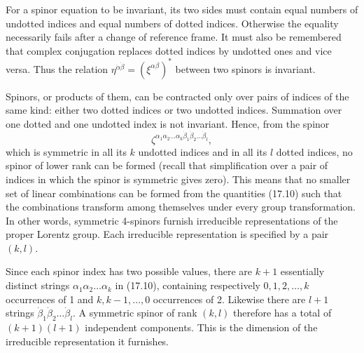 For a spinor equation to be invariant, its two sides must contain equal numbers of undotted indices and equal numbers of dotted indices. Otherwise the equality necessarily fails after a change of reference frame. It must also be remembered that complex conjugation replaces dotted indices by undotted ones and vice versa. Thus the relation $\eta^{\dot\alpha\dot\beta}=(\xi^{\alpha\beta})^*$ between two spinors is invariant.

Spinors, or products of them, can be contracted only over pairs of indices of the same kind: either two dotted indices or two undotted indices. Summation over one dotted and one undotted index is not invariant. Hence, from the spinor
\begin{equation}
\zeta^{\alpha_1\alpha_2\ldots\alpha_k\dot\beta_1\dot\beta_2\ldots\dot\beta_l},
\tag{17.10}
\end{equation}
which is symmetric in all its $k$ undotted indices and in all its $l$ dotted indices, no spinor of lower rank can be formed (recall that simplification over a pair of indices in which the spinor is symmetric gives zero). This means that no smaller set of linear combinations can be formed from the quantities (17.10) such that the combinations transform among themselves under every group transformation. In other words, symmetric 4-spinors furnish irreducible representations of the proper Lorentz group. Each irreducible representation is specified by a pair $(k,l)$.

Since each spinor index has two possible values, there are $k+1$ essentially distinct strings $\alpha_1\alpha_2\ldots\alpha_k$ in (17.10), containing respectively $0,1,2,\ldots,k$ occurrences of 1 and $k,k-1,\ldots,0$ occurrences of 2. Likewise there are $l+1$ strings $\dot\beta_1\dot\beta_2\ldots\dot\beta_l$. A symmetric spinor of rank $(k,l)$ therefore has a total of $(k+1)(l+1)$ independent components. This is the dimension of the irreducible representation it furnishes.
